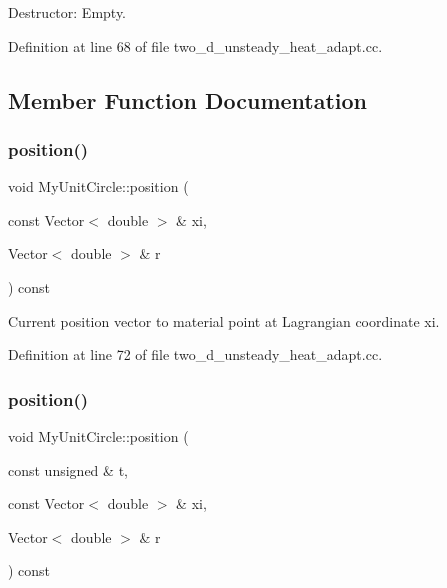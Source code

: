Destructor\+: Empty. 



Definition at line 68 of file two\+\_\+d\+\_\+unsteady\+\_\+heat\+\_\+adapt.\+cc.



\subsection{Member Function Documentation}
\mbox{\label{classMyUnitCircle_ab60b73d1c28b013c40dd2aaa98072261}} 
\subsubsection{\texorpdfstring{position()}{position()}\hspace{0.1cm}{\footnotesize\ttfamily [1/2]}}
{\footnotesize\ttfamily void My\+Unit\+Circle\+::position (\begin{DoxyParamCaption}\item[{const Vector$<$ double $>$ \&}]{xi,  }\item[{Vector$<$ double $>$ \&}]{r }\end{DoxyParamCaption}) const\hspace{0.3cm}{\ttfamily [inline]}}



Current position vector to material point at Lagrangian coordinate xi. 



Definition at line 72 of file two\+\_\+d\+\_\+unsteady\+\_\+heat\+\_\+adapt.\+cc.

\mbox{\label{classMyUnitCircle_a6a38e6320399940db4c9858668189ec3}} 
\subsubsection{\texorpdfstring{position()}{position()}\hspace{0.1cm}{\footnotesize\ttfamily [2/2]}}
{\footnotesize\ttfamily void My\+Unit\+Circle\+::position (\begin{DoxyParamCaption}\item[{const unsigned \&}]{t,  }\item[{const Vector$<$ double $>$ \&}]{xi,  }\item[{Vector$<$ double $>$ \&}]{r }\end{DoxyParamCaption}) const\hspace{0.3cm}{\ttfamily [inline]}}



